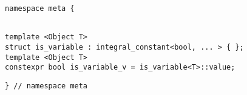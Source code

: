
\begin{verbatim}
namespace meta {
\end{verbatim}
\begin{verbatim}

template <Object T>
struct is_variable : integral_constant<bool, ... > { };
template <Object T>
constexpr bool is_variable_v = is_variable<T>::value;

\end{verbatim}
\begin{verbatim}
} // namespace meta
\end{verbatim}
